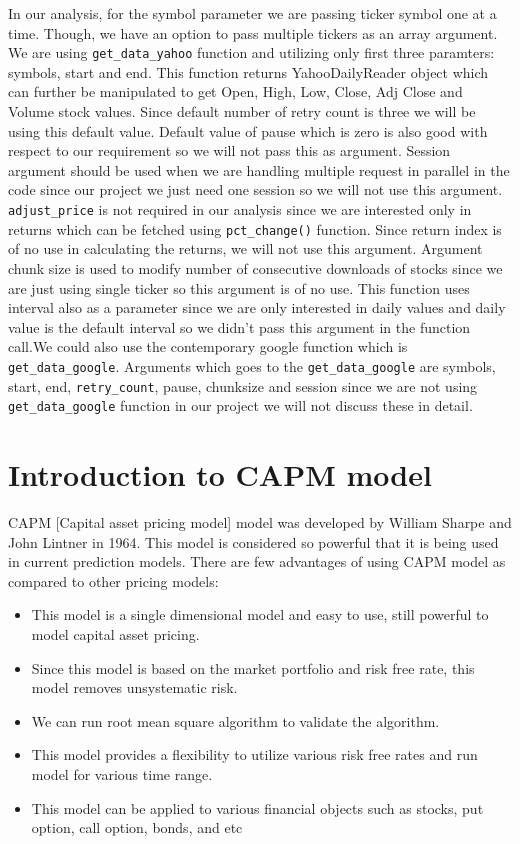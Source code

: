 \indent 
In our analysis, for the symbol parameter we are passing ticker symbol one at a time. Though, we have an option to pass multiple tickers as an array argument. 
We are using \texttt{get\_data\_yahoo} function and utilizing only
first three paramters: symbols, start and end.  This function returns YahooDailyReader object which can further be manipulated to get Open, High, Low, Close, Adj Close
and Volume stock values. Since default number of retry count is three we will be using this default value. Default value of pause which is zero is also good with
respect to our requirement so we will not pass this as argument. Session argument should be used when we are handling multiple request in parallel  in the code
since our project we just need one session so we will not use this argument. \texttt{adjust\_price} is not required in our analysis since we are interested only in returns
which can be fetched using \texttt{pct\_change()} function. Since return index is of no use in calculating the returns, we will not use this argument.
Argument chunk size is used to modify number of consecutive downloads of stocks since we are just using single ticker so this argument is of no use.
This function uses interval also as a parameter since we are only interested in daily values and daily value is the default 
interval so we didn't pass this argument in the function call.We could also use the contemporary google function which is \texttt{get\_data\_google}.
Arguments which goes to the \texttt{get\_data\_google} are symbols, start, end, \texttt{retry\_count}, pause, chunksize and session since we are not using 
\texttt{get\_data\_google} function in our project we will not discuss these in detail. 

\section{Introduction to CAPM model}

CAPM [Capital asset pricing model] model was developed by William Sharpe and John Lintner in 1964. This model is considered so powerful that it is being used in current 
prediction models. There are few advantages of using CAPM model as compared to other pricing models:

\begin{itemize}
\item This model is a single dimensional model and easy to use, still powerful to model capital asset pricing. 
\item Since this model is based on the market portfolio and risk free rate, this model removes unsystematic risk.  
\item We can run root mean square algorithm to validate the algorithm.
\item This model provides a flexibility to utilize various risk free rates and run model for various time range. 
\item This model can be applied to various financial objects such as stocks, put option, call option, bonds, and etc

\end{itemize}

